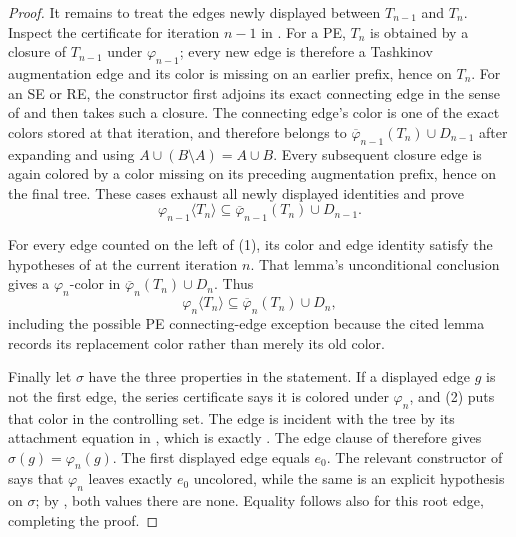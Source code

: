 \begin{proof}
It remains to treat the edges newly displayed between \(T_{n-1}\) and
\(T_n\).  Inspect the certificate for iteration \(n-1\) in
.  For a PE, \(T_n\) is obtained by a closure of
\(T_{n-1}\) under \(\varphi_{n-1}\); every new edge is therefore a
Tashkinov augmentation edge and its color is missing on an earlier prefix,
hence on \(T_n\).  For an SE or RE, the constructor first adjoins its exact
connecting edge in the sense of  and then
takes such a closure.  The connecting edge's
color is one of the exact colors stored at that iteration, and therefore
belongs to
\(\overline\varphi_{n-1}(T_n)\cup D_{n-1}\) after expanding
 and using
\(A\cup(B\setminus A)=A\cup B\).  Every subsequent closure edge is again
colored by a color missing on its preceding augmentation prefix, hence on
the final tree.  These cases exhaust all newly displayed identities and
prove
\[
 \varphi_{n-1}\langle T_n\rangle
 \subseteq\overline\varphi_{n-1}(T_n)\cup D_{n-1}.               \tag{1}
\]

For every edge counted on the left of (1), its color and edge identity
satisfy the hypotheses of  at the
current iteration \(n\).  That lemma's unconditional conclusion gives a
\(\varphi_n\)-color in
\(\overline\varphi_n(T_n)\cup D_n\).  Thus
\[
 \varphi_n\langle T_n\rangle
 \subseteq\overline\varphi_n(T_n)\cup D_n,                       \tag{2}
\]
including the possible PE connecting-edge exception because the cited
lemma records its replacement color rather than merely its old color.

Finally let \(\sigma\) have the three properties in the statement.  If a
displayed edge \(g\) is not the first edge, the series certificate says it
is colored under \(\varphi_n\), and (2) puts that color in the controlling
set.  The edge is incident with the tree by its attachment equation in
, which is exactly .
The edge clause of  therefore
gives \(\sigma(g)=\varphi_n(g)\).  The first displayed edge equals
\(e_0\).  The relevant constructor of  says
that \(\varphi_n\) leaves exactly \(e_0\) uncolored, while the same is an
explicit hypothesis on \(\sigma\); by , both
values there are \(\mathrm{none}\).  Equality follows also for this root
edge, completing the proof.
\end{proof}
